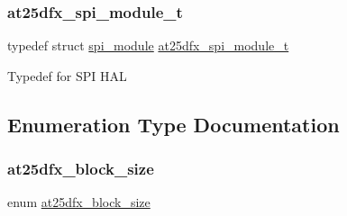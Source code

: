 \subsubsection{\texorpdfstring{at25dfx\_spi\_module\_t}{at25dfx\_spi\_module\_t}}
{\footnotesize\ttfamily typedef struct \mbox{\hyperlink{structspi__module}{spi\+\_\+module}} \mbox{\hyperlink{group__asfdoc__common2__at25dfx__group_ga78981ccb6b863d6548f343fe01792406}{at25dfx\+\_\+spi\+\_\+module\+\_\+t}}}

Typedef for S\+PI H\+AL 

\subsection{Enumeration Type Documentation}
\mbox{\label{group__asfdoc__common2__at25dfx__group_ga1b6ad4d489afc2892947e731f9be059b}} 
\subsubsection{\texorpdfstring{at25dfx\_block\_size}{at25dfx\_block\_size}}
{\footnotesize\ttfamily enum \mbox{\hyperlink{group__asfdoc__common2__at25dfx__group_ga1b6ad4d489afc2892947e731f9be059b}{at25dfx\+\_\+block\+\_\+size}}}

